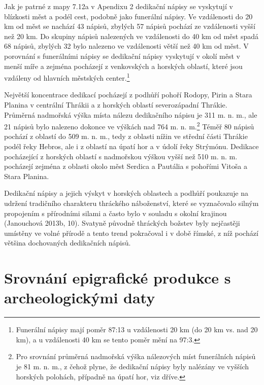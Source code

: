 Jak je patrné z mapy 7.12a v Apendixu 2 dedikační nápisy se vyskytují v blízkosti měst a podél cest, podobně jako funerální nápisy. Ve vzdálenosti do 20 km od měst se nachází 43  nápisů, zbylých 57  nápisů pochází ze vzdálenosti vyšší než 20 km. Do skupiny nápisů nalezených ve vzdálenosti do 40 km od měst spadá 68  nápisů, zbylých 32  bylo nalezeno ve vzdálenosti větší než 40 km od měst. V porovnání s funerálními nápisy se dedikační nápisy vyskytují v okolí měst v menší míře a zejména pocházejí z venkovských a horských oblastí, které jsou vzdáleny od hlavních městských center.\footnote{Funerální nápisy mají poměr 87:13 u vzdálenosti 20 km (do 20 km vs. nad 20 km), a u vzdálenosti 40 km se tento poměr mění na 97:3.}

Největší koncentrace dedikací pocházejí z podhůří pohoří Rodopy, Pirin a Stara Planina v centrální Thrákii a z horských oblastí severozápadní Thrákie. Průměrná nadmořská výška místa nálezu dedikačního nápisu je 311 m. n. m., ale 21 nápisů bylo nalezeno dokonce ve výškách nad 764 m. n. m.\footnote{Pro srovnání průměrná nadmořská výška nálezových míst funerálních nápisů je 81 m. n. m., z čehož plyne, že dedikační nápisy byly nalézány ve vyšších horských polohách, případně na úpatí hor, viz dříve.} Téměř 80  nápisů pochází z oblastí do 509 m. n. m., tedy z oblasti nížin ve střední části Thrákie podél řeky Hebros, ale i z oblastí na úpatí hor a v údolí řeky Strýmónu. Dedikace pocházející z horských oblastí s nadmořskou výškou vyšší než 510 m. n. m. pocházejí zejména z oblasti okolo měst Serdica a Pautália s pohořími Vitoša a Stara Planina.

Dedikační nápisy a jejich výskyt v horských oblastech a podhůří poukazuje na udržení tradičního charakteru thráckého náboženství, které se vyznačovalo silným propojením s přírodními silami a často bylo v souladu s okolní krajinou (Janouchová 2013b, 10). Svatyně původně thráckých božstev byly nejčastěji umístěny ve volné přírodě a tento trend pokračoval i v době římské, z níž pochází většina dochovaných dedikačních nápisů.

\section[srovnání-epigrafické-produkce-s-archeologickými-daty]{Srovnání epigrafické produkce s archeologickými daty}

